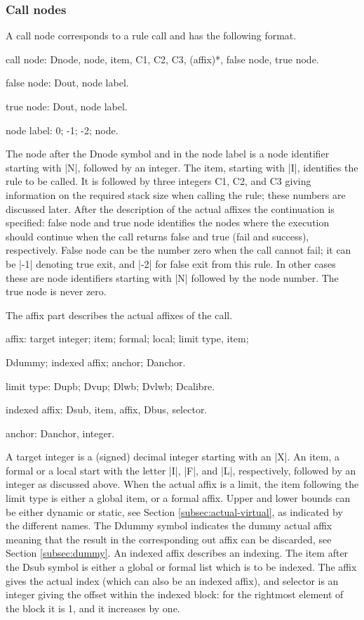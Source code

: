 \documentclass[titlepage]{article}
\newenvironment{grammar}{%
\begin{list}{}{%
\setlength\leftmargin{18pt}%
\setlength\rightmargin{-5pt}%
\setlength\listparindent{20pt}%
\setlength\itemsep{1pt plus0.2ex}%
\setlength\parsep{0pt plus 2pt}%
\setlength\labelsep{-5pt}%
}\color{blue!90!black}\sf\mkoptions%
}{\end{list}}
\newcommand\g[1]{\textsf{\color{blue!90!black}#1}}
\begin{document}
\subsubsection{Call nodes}
A call node  corresponds to a rule call and has the following format.
\begin{grammar}
\item call node: Dnode, node, item, C1, C2, C3, (affix)*, false node,
true node.
\item false node: Dout, node label.
\item true node: Dout, node label.
\item node label: 0; -1; -2; node.
\end{grammar}
\noindent
The \g{node} after the \g{Dnode} symbol and in the \g{node label} is a node 
identifier starting with \pp|N|, followed by an integer. The \g{item}, 
starting with \pp|I|, identifies the rule to be called. It is followed by
three integers \g{C1}, \g{C2}, and \g{C3} giving information on the required
stack size when calling the rule; these numbers are discussed later. After the 
description of the actual affixes the continuation is specified:
\g{false node} and \g{true node} identifies the nodes where the 
execution should continue when the call returns false and true (fail and
success), respectively. 
\g{False node} can be the number zero when the call cannot fail; it can be
\pp|-1| denoting true exit, and  \pp|-2| for false exit from this rule. 
In other cases these are node identifiers starting with \pp|N| followed by 
the node number. The \g{true node} is never zero.

The \g{affix} part describes the actual affixes of the call.
\begin{grammar}
\item affix: target integer; item; formal; local; limit type, item;

   Ddummy; indexed affix; anchor; Danchor.
\item limit type: Dupb; Dvup; Dlwb; Dvlwb; Dcalibre.
\item indexed affix: Dsub, item, affix, Dbus, selector.
\item anchor: Danchor, integer.
\end{grammar}
A \g{target integer} is a (signed) decimal integer starting with an \pp|X|.
An \g{item}, a \g{formal} or a \g{local} start with the letter \pp|I|,
\pp|F|, and \pp|L|, respectively, followed by an integer as discussed above.
When the actual affix is a limit, the \g{item} following the \g{limit type}
is either a global \g{item}, or a \g{formal} affix. Upper and lower bounds
can be either dynamic or static, see Section \ref{subsec:actual-virtual}, as
indicated by the different names.
The \g{Ddummy} symbol indicates the \g{dummy} actual affix meaning that the
result in the corresponding out affix can be discarded, see Section
\ref{subsec:dummy}. An \g{indexed affix} describes an indexing. The \g{item}
after the \g{Dsub} symbol is either a global or formal list which is to be
indexed. The \g{affix} gives the actual index (which can also be an indexed
affix), and \g{selector} is an integer giving the offset within the indexed
block: for the rightmost element of the block it is 1, and it increases by
one.
\end{document}
